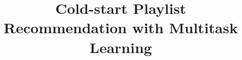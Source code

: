 \documentclass[letterpaper]{article} %
\begin{document}

\title{Cold-start Playlist Recommendation with Multitask Learning}


\maketitle

\begin{abstract}

\end{abstract}


%



\clearpage
\newpage



\clearpage
\newpage


{\small

}

\clearpage
\newpage
\onecolumn
\appendix

\end{document}
